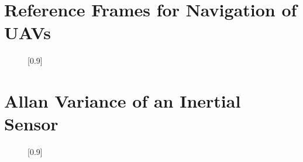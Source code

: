 \documentclass{article}
\begin{document}
	\section{Reference Frames for Navigation of UAVs}
	\begin{figure}[h!]
		\centering
		\scalebox{0.9}[0.9]{}
	\end{figure}
	\pagebreak
	\section{Allan Variance of an Inertial Sensor}
	\begin{figure}[h!]
		\centering
		\scalebox{0.9}[0.9]{}
	\end{figure}
	\pagebreak
\end{document}
